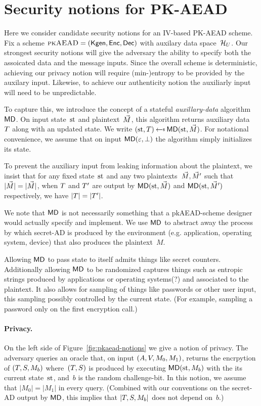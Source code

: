 
\section{Security notions for PK-AEAD} 
Here we consider candidate security notions for an IV-based PK-AEAD scheme.  Fix a scheme $\textsc{pkAEAD}=(\mathsf{Kgen},{\mathsf{Enc}},{\mathsf{Dec}})$ with auxilary data space~$\mathcal{H}_U$.  Our strongest security notions will give the adversary the ability to specify both the assoicated data and the message inputs.  Since the overall scheme is deterministic, achieving our privacy notion will require (min-)entropy to be provided by the auxilary input.  Likewise, to achieve our authenticity notion the auxiliarly input will need to be unpredictable.

To capture this, we introduce the concept of a stateful \emph{auxillary-data} algorithm $\mathsf{MD}$.  On input state~$\mathrm{st}$ and plaintext~$\vec{M}$, this algorithm returns auxiliary data~$T$ along with an updated state.  We write $(\st,\umd) \getsr \mdalg(\st,\vmsg)$. For notational convenience, we assume that on input $\mathsf{MD}(\varepsilon,\bot)$ the algorithm simply initializes its state. 

To prevent the auxiliary input from leaking information about the plaintext, we insist that for any fixed state~$\mathrm{st}$ and any two plaintexts~$\vec{M},\vec{M}'$ such that $|\vec{M}|=|\vec{M}|$, when $T$ and $T'$ are output by $\mathsf{MD}(\mathrm{st},\vec{M})$ and $\mathsf{MD}(\mathrm{st},\vec{M}')$ respectively, we have $|T|=|T'|$. 

We note that $\mathsf{MD}$ is not necessarily something that a pkAEAD-scheme designer would actually specify and implement.  We use $\mathsf{MD}$ to abstract away the process by which secret-AD is produced by the environment (e.g. application, operating system, device) that also produces the plaintext~$M$. 

Allowing $\mathsf{MD}$ to pass state to itself admits things like secret counters.  Additionally allowing $\mathsf{MD}$ to be randomized captures things such as entropic strings produced by applications or operating systems(?) and associated to the plaintext.  It also allows for sampling of things like passwords or other user input, this sampling possibly controlled by the current state.  (For example, sampling a password only on the first encryption call.)


\paragraph{Privacy. }
On the left side of Figure~\ref{fig:pkaead-notions} we give a notion of privacy.  The adversary queries an oracle that, on input $(A,V,M_0,M_1)$, returns the encrpytion of $(T,S,M_b)$ where~$(T,S)$ is produced by executing $\mathsf{MD}(\mathrm{st},M_b)$ with the its current state~$\mathrm{st}$, and~$b$ is the random challenge-bit.  In this notion, we assume that $|M_0|=|M_1|$ in every query.  (Combined with our conventions on the secret-AD output by $\mathsf{MD}$, this implies that $|T,S,M_b|$ does not depend on~$b$.) 


